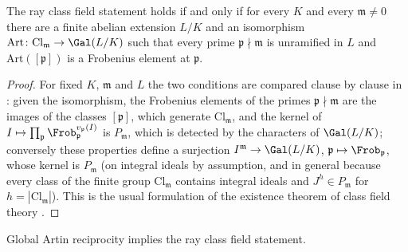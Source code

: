 \begin{lemma}\label{pf:sh-misc:rayforms}
The ray class field statement holds if and only if for every $K$ and every $\mathfrak m\ne0$ there are a finite abelian extension $L/K$ and an
isomorphism $\mathrm{Art}\colon\mathrm{Cl}_{\mathfrak m}\to\Gal(L/K)$ such that every prime $\mathfrak p\nmid\mathfrak m$ is unramified in $L$ and
$\mathrm{Art}([\mathfrak p])$ is a Frobenius element at $\mathfrak p$.
\end{lemma}

\begin{proof}
For fixed $K$, $\mathfrak m$ and $L$ the two conditions are compared clause by clause in :
given the isomorphism, the Frobenius elements of the primes $\mathfrak p\nmid\mathfrak m$ are the images of the classes $[\mathfrak p]$, which
generate $\mathrm{Cl}_{\mathfrak m}$, and the kernel of $I\mapsto\prod_{\mathfrak p}\Frob_{\mathfrak p}^{v_{\mathfrak p}(I)}$ is $P_{\mathfrak m}$, which is
detected by the characters of $\Gal(L/K)$; conversely these properties define a surjection $I^{\mathfrak m}\to\Gal(L/K)$,
$\mathfrak p\mapsto\Frob_{\mathfrak p}$, whose kernel is $P_{\mathfrak m}$ (on integral ideals by assumption, and in general because every class
of the finite group $\mathrm{Cl}_{\mathfrak m}$ contains integral ideals and $J^h\in P_{\mathfrak m}$ for $h=|\mathrm{Cl}_{\mathfrak m}|$). This is the
usual formulation of the existence theorem of class field theory \cite{Neukirch1999}.
\end{proof}

\begin{theorem}\label{pf:sh-misc:rayfield}
Global Artin reciprocity implies the ray class field statement.
\end{theorem}

